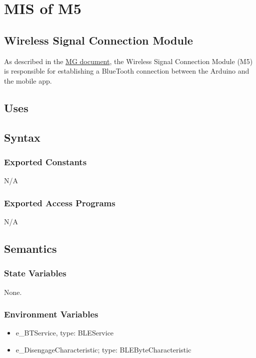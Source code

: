 \documentclass[12pt, titlepage]{article}
\begin{document}
\section{MIS of M5 \label{WirelessSignalConnection}} 

\subsection{Wireless Signal Connection Module}

As described in the \href{https://github.com/NevoAbigail/Capstone/blob/main/docs/Design/SoftArchitecture/MG.pdf}{MG document}, the Wireless Signal Connection Module (M5) is responsible for establishing a BlueTooth connection between the Arduino and the mobile app.

\subsection{Uses}


\subsection{Syntax}

\subsubsection{Exported Constants}

N/A

\subsubsection{Exported Access Programs}

N/A

\subsection{Semantics}

\subsubsection{State Variables}

None.

\subsubsection{Environment Variables}

\begin{itemize}
\item e\_BTService, type: BLEService
\item e\_DisengageCharacteristic; type: BLEByteCharacteristic
\end{itemize}
\end{document}
